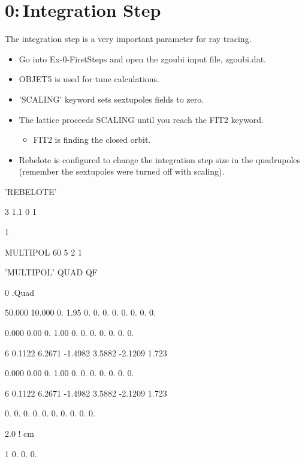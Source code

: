 \documentclass{beamer}
\begin{document}
\section{0:\,Integration Step}
\begin{frame}
The integration step is a very important parameter for ray tracing.
\begin{itemize}
\item Go into Ex-0-FirstSteps and open the zgoubi input file, zgoubi.dat.
\item OBJET5 is used for tune calculations.
\item 'SCALING' keyword sets sextupoles fields to zero.
\item The lattice proceeds SCALING until you reach the FIT2 keyword.
\begin{itemize}
\item FIT2 is finding the closed orbit.
\end{itemize}
\item Rebelote is configured to change the integration step size in the quadrupoles (remember the sextupoles were turned off with scaling).
\end{itemize}
\tiny
\hspace*{0.2\textwidth}
\begin{minipage}{0.2\textwidth}


'REBELOTE'
                                                                   
3 1.1 0 1

1

MULTIPOL 60  5 2 1
\end{minipage}
\hspace{0.1\textwidth}
\begin{minipage}{0.4\textwidth}
 'MULTIPOL'  QUAD  QF    

0  .Quad

50.000  10.000  0.  1.95  0.  0.  0.  0.  0.  0.  0.  0.

0.000   0.00   0.  1.00  0.  0.  0.  0.  0.  0.  0.

6  0.1122 6.2671 -1.4982 3.5882 -2.1209 1.723

0.000   0.00   0.  1.00  0.  0.  0.  0.  0.  0.  0.

6  0.1122 6.2671 -1.4982 3.5882 -2.1209 1.723

0.  0.  0.  0.  0.  0.  0.  0.  0.  0.

2.0  ! cm

1 0. 0. 0.
\end{minipage}
\end{frame}
\end{document}
